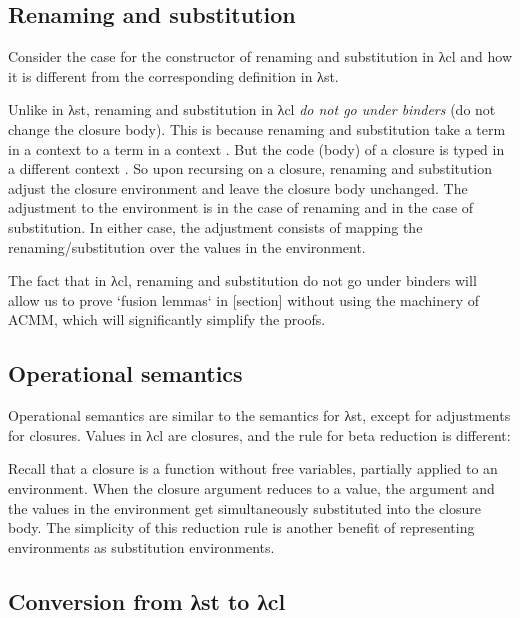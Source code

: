 \documentclass[bsc,frontabs,twoside,singlespacing,parskip,deptreport]{infthesis}
\theoremstyle{definition}
\begin{document}
\subsection{Renaming and substitution}
\label{sec:renam-subst}

Consider the case for the constructor  of renaming and
substitution in λcl and how it is different from the corresponding
definition in λst.


Unlike in λst, renaming and substitution in λcl \textit{do not go
  under binders} (do not change the closure body). This is because
renaming and substitution take a term in a context  to a term in
a context . But the code (body) of a closure is typed in a
different context . So upon recursing on a closure, renaming and
substitution adjust the closure environment and leave the closure body
unchanged. The adjustment to the environment is 
in the case of renaming and  in the case of
substitution. In either case, the adjustment consists of mapping the
renaming/substitution over the values in the environment.

The fact that in λcl, renaming and substitution do not go under
binders will allow us to prove `fusion lemmas` in [section] without
using the machinery of ACMM, which will significantly simplify the
proofs.

\subsection{Operational semantics}
\label{sec:oper-semant}

Operational semantics are similar to the semantics for λst, except for
adjustments for closures. Values in λcl are closures, and the rule for
beta reduction is different:


Recall that a closure is a function without free variables,
partially applied to an environment. When the closure argument reduces
to a value, the argument and the values in the environment get
simultaneously substituted into the closure body. The simplicity of
this reduction rule is another benefit of representing environments as
substitution environments.

\subsection{Conversion from λst to λcl}
\label{sec:conversion-from-st}
\end{document}
